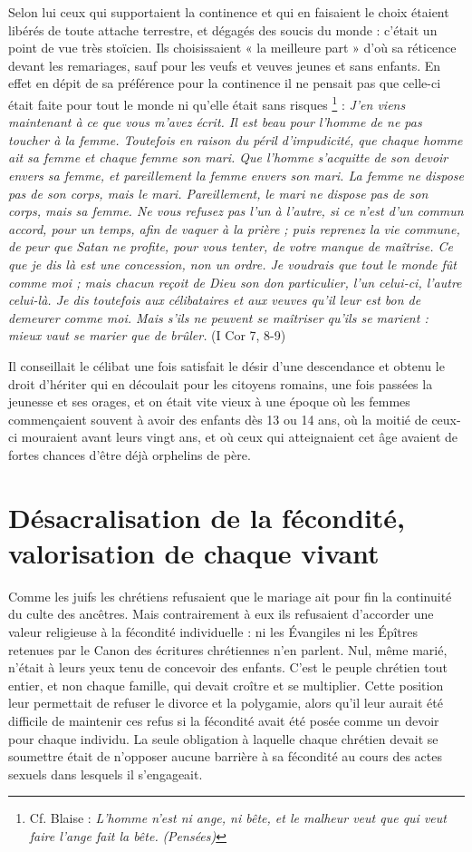 Selon lui ceux qui supportaient la continence et qui en faisaient le choix étaient libérés de toute attache terrestre, et dégagés des soucis du monde : c'était un point de vue très stoïcien. Ils choisissaient « la meilleure part » d'où sa réticence devant les remariages, sauf pour les veufs et veuves jeunes et sans enfants. En effet en dépit de sa préférence pour la continence il ne pensait pas que celle-ci était faite pour tout le monde ni qu'elle était sans risques%
\footnote{Cf. Blaise  : \emph{L'homme n'est ni ange, ni bête, et le malheur veut que qui veut faire l'ange fait la bête.} \emph{(Pensées)}}
: \emph{J'en viens maintenant à ce que vous m'avez écrit. Il est beau pour l'homme de ne pas toucher à la femme. Toutefois en raison du péril d'impudicité, que chaque homme ait sa femme et chaque femme son mari. Que l'homme s'acquitte de son devoir envers sa femme, et pareillement la femme envers son mari. La femme ne dispose pas de son corps, mais le mari. Pareillement, le mari ne dispose pas de son corps, mais sa femme. Ne vous refusez pas l'un à l'autre, si ce n'est d'un commun accord, pour un temps, afin de vaquer à la prière ; puis reprenez la vie commune, de peur que Satan ne profite, pour vous tenter, de votre manque de maîtrise. Ce que je dis là est une concession, non un ordre. Je voudrais que tout le monde fût comme moi ; mais chacun reçoit de Dieu son don particulier, l'un celui-ci, l'autre celui-là. Je dis toutefois aux célibataires et aux veuves qu'il leur est bon de demeurer comme moi. Mais s'ils ne peuvent se maîtriser qu'ils se marient : mieux vaut se marier que de brûler.} (I Cor 7, 8-9)

 Il conseillait le célibat une fois satisfait le désir d'une descendance et obtenu le droit d'hériter qui en découlait pour les citoyens romains, une fois passées la jeunesse et ses orages, et on était vite vieux à une époque où les femmes commençaient souvent à avoir des enfants dès 13 ou 14 ans, où la moitié de ceux-ci mouraient avant leurs vingt ans, et où ceux qui atteignaient cet âge avaient de fortes chances d'être déjà orphelins de père. 


\section{Désacralisation de la fécondité, valorisation de chaque vivant}

 Comme les juifs les chrétiens refusaient que le mariage ait pour fin la continuité du culte des ancêtres. Mais contrairement à eux ils refusaient d'accorder une valeur religieuse à la fécondité individuelle : ni les Évangiles ni les Épîtres retenues par le Canon des écritures chrétiennes n'en parlent. Nul, même marié, n'était à leurs yeux tenu de concevoir des enfants. C'est le peuple chrétien tout entier, et non chaque famille, qui devait croître et se multiplier. Cette position leur permettait de refuser le divorce et la polygamie, alors qu'il leur aurait été difficile de maintenir ces refus si la fécondité avait été posée comme un devoir pour chaque individu. La seule obligation à laquelle chaque chrétien devait se soumettre était de n'opposer aucune barrière à sa fécondité au cours des actes sexuels dans lesquels il s'engageait. 

